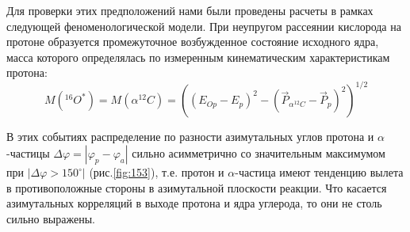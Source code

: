 \documentclass[fontsize=14pt]{scrreport}
\begin{document}
Для проверки этих предположений нами были проведены расчеты в рамках следующей феноменологической модели. При неупругом рассеянии кислорода на протоне образуется промежуточное возбужденное состояние исходного ядра, масса которого определялась по измеренным кинематическим характеристикам протона:
\begin{equation}
    M(^{16}O^{*})=M(\alpha^{12}C)=\left((E_{Op}-E_{p})^{2}-
    (\vec{P}_{\alpha^{12}C}-\vec{P}_{p})^{2}
    \right)^{1/2}
    \label{equa2}
\end{equation}



В этих событиях распределение по разности азимутальных углов протона и $\alpha$-частицы $\Delta\varphi=|\varphi_{p}-\varphi_{a}|$ сильно асимметрично со значительным максимумом при $|\Delta\varphi>150^{\circ}|$ (рис.\ref{fig:153}), т.е. протон и $\alpha$-частица имеют тенденцию вылета в противоположные стороны в азимутальной плоскости реакции. Что касается азимутальных корреляций в выходе протона и ядра углерода, то они не столь сильно выражены.
\end{document}
